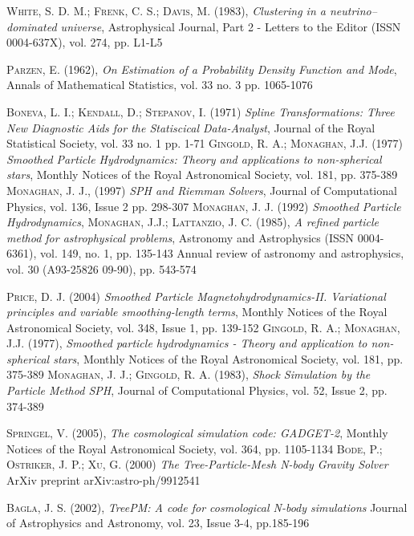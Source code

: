 \documentclass[a4paper,openright,12pt]{book}
\begin{document}
\begin{thebibliography}{a}
 \textsc{White, S. D. M.; Frenk, C. S.; Davis, M. (1983)},
\textit{Clustering in a neutrino--dominated universe},
Astrophysical Journal, Part 2 - Letters to the Editor (ISSN 0004-637X), vol. 274, pp. L1-L5

 \textsc{Parzen, E. (1962)},
\textit{On Estimation of a Probability Density Function and Mode},
Annals of Mathematical Statistics, vol. 33 no. 3 pp. 1065-1076

 \textsc{Boneva, L. I.; Kendall, D.; Stepanov, I. (1971)}
\textit{Spline Transformations: Three New Diagnostic Aids for the Statiscical Data-Analyst},
Journal of the Royal Statistical Society, vol. 33 no. 1 pp. 1-71
 \textsc{Gingold, R. A.; Monaghan, J.J. (1977)}
\textit{Smoothed Particle Hydrodynamics: Theory and applications to non-spherical stars},
Monthly Notices of the Royal Astronomical Society, vol. 181, pp. 375-389
 \textsc{Monaghan, J. J., (1997)}
\textit{SPH and Riemman Solvers},
Journal of Computational Physics, vol. 136, Issue 2 pp. 298-307 
 \textsc{Monaghan, J. J. (1992)}
\textit{Smoothed Particle Hydrodynamics},
 \textsc{Monaghan, J.J.; Lattanzio, J. C. (1985)},
\textit{A refined particle method for astrophysical problems},
Astronomy and Astrophysics (ISSN 0004-6361), vol. 149, no. 1, pp. 135-143
Annual review of astronomy and astrophysics, vol. 30 (A93-25826 09-90), pp. 543-574


 \textsc{Price, D. J. (2004)}
\textit{Smoothed Particle Magnetohydrodynamics-II. Variational principles and variable smoothing-length terms},
Monthly Notices of the Royal Astronomical Society, vol. 348, Issue 1, pp. 139-152
 \textsc{Gingold, R. A.; Monaghan, J.J. (1977)},
\textit{Smoothed particle hydrodynamics - Theory and application to non-spherical stars},
Monthly Notices of the Royal Astronomical Society, vol. 181, pp. 375-389
 \textsc{Monaghan, J. J.; Gingold, R. A. (1983)},
\textit{Shock Simulation by the Particle Method SPH},
Journal of Computational Physics, vol. 52, Issue 2, pp. 374-389

 \textsc{Springel, V. (2005)},
\textit{The cosmological simulation code: GADGET-2},
Monthly Notices of the Royal Astronomical Society, vol. 364, pp. 1105-1134
 \textsc{Bode, P.; Ostriker, J. P.; Xu, G. (2000)}
\textit{The Tree-Particle-Mesh N-body Gravity Solver}
ArXiv preprint arXiv:astro-ph/9912541 


 \textsc{Bagla, J. S. (2002)},
\textit{TreePM: A code for cosmological N-body simulations}
Journal of Astrophysics and Astronomy, vol. 23, Issue 3-4, pp.185-196


\end{thebibliography}
\end{document}
